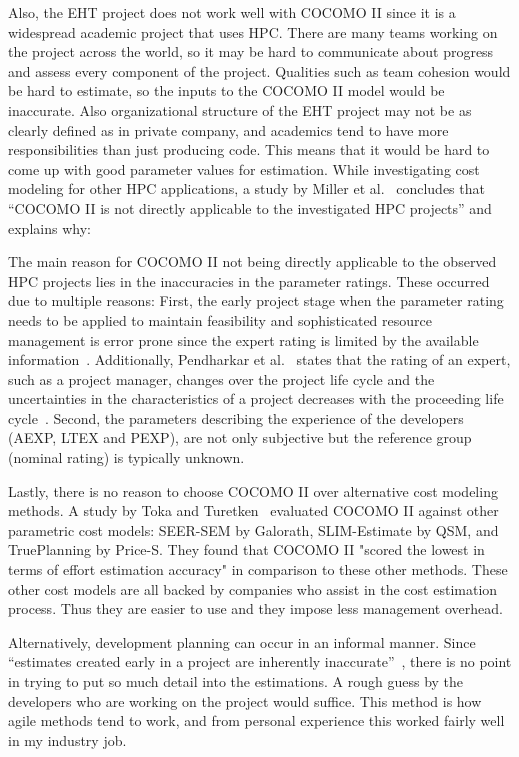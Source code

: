 \documentclass[letterpaper,twocolumn,10pt]{article}
\begin{document}
Also, the EHT project does not work well with COCOMO II since it is a widespread academic project that uses HPC. There are many teams working on the project
across the world, so it may be hard to communicate about progress and assess every component of the project. Qualities such as team cohesion would be hard to estimate,
so the inputs to the COCOMO II model would be inaccurate. Also organizational structure of the EHT project may not be as clearly defined as in private
company, and academics tend to have more responsibilities than just producing code. This means that it would be hard to come up with good
parameter values for estimation. While investigating cost modeling for other HPC applications, a study by Miller et al.~\cite{Miller} concludes that
``COCOMO II is not directly applicable to the investigated HPC projects'' and explains why:
\begin{displayquote}
The main reason for COCOMO II not being directly
applicable to the observed HPC projects lies in the
inaccuracies in the parameter ratings. These occurred due to
multiple reasons: First, the early project stage when the
parameter rating needs to be applied to maintain feasibility
and sophisticated resource management is error prone since
the expert rating is limited by the available information~\cite{Musilek}.
Additionally, Pendharkar et al.~\cite{Pendharkar} states that the rating of an expert,
such as a project manager, changes over the project life cycle and the
uncertainties in the characteristics of a project decreases
with the proceeding life cycle~\cite{Boehm}.
Second, the parameters describing the experience of the
developers (AEXP, LTEX and PEXP), are not only
subjective but the reference group (nominal rating) is
typically unknown.
\end{displayquote}

Lastly, there is no reason to choose COCOMO II over alternative cost modeling methods. A study by Toka and Turetken~\cite{Toka} evaluated
COCOMO II against other parametric cost models: SEER-SEM by Galorath, SLIM-Estimate by QSM, and TruePlanning by Price-S. They found that
COCOMO II "scored the lowest in terms of effort estimation accuracy" in comparison to these other methods. These other cost models are
all backed by companies who assist in the cost estimation process. Thus they are easier to use and they impose less management overhead.

Alternatively, development planning can occur in an informal manner. Since ``estimates created early in a project are inherently
inaccurate''~\cite{McConnell}, there is no point in trying to put so much detail into the estimations. A rough guess by the developers
who are working on the project would suffice. This method is how agile methods tend to work, and from personal experience this worked
fairly well in my industry job.
\end{document}
